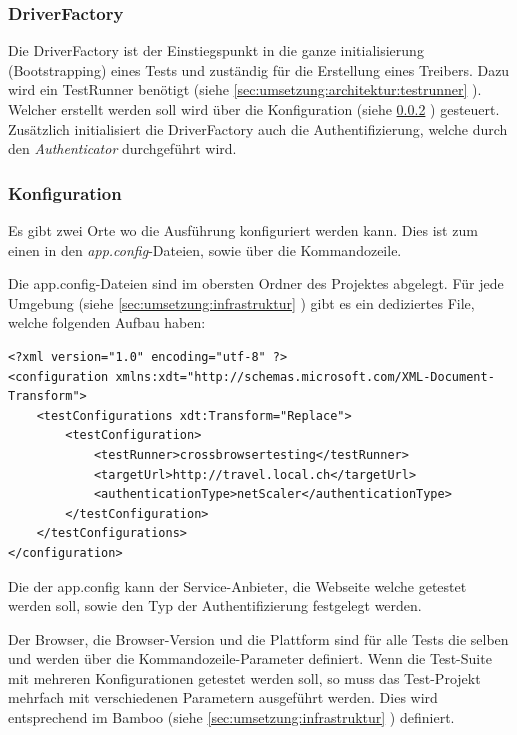 \subsubsection{DriverFactory}
\label{sec:umsetzung:Architektur:DriverFactory}
Die DriverFactory ist der Einstiegspunkt in die ganze initialisierung (Bootstrapping) eines Tests und zuständig für die Erstellung eines Treibers. Dazu wird ein TestRunner benötigt (siehe \cref{sec:umsetzung:architektur:testrunner} ). Welcher erstellt werden soll wird über die Konfiguration (siehe \cref{sec:umsetzung:architektur:bootstrap:konfiguration} ) gesteuert. Zusätzlich initialisiert die DriverFactory auch die Authentifizierung, welche durch den \textit{Authenticator} durchgeführt wird.

\subsubsection{Konfiguration}
\label{sec:umsetzung:architektur:bootstrap:konfiguration}
Es gibt zwei Orte wo die Ausführung konfiguriert werden kann. Dies ist zum einen in den \textit{app.config}-Dateien, sowie über die Kommandozeile.

Die app.config-Dateien sind im obersten Ordner des Projektes abgelegt. Für jede Umgebung (siehe \cref{sec:umsetzung:infrastruktur} ) gibt es ein dediziertes File, welche folgenden Aufbau haben:

\lstset{language=xml}
\begin{lstlisting}
<?xml version="1.0" encoding="utf-8" ?>
<configuration xmlns:xdt="http://schemas.microsoft.com/XML-Document-Transform">
	<testConfigurations xdt:Transform="Replace">
		<testConfiguration>
			<testRunner>crossbrowsertesting</testRunner>
			<targetUrl>http://travel.local.ch</targetUrl>
			<authenticationType>netScaler</authenticationType>
		</testConfiguration>
	</testConfigurations>
</configuration>
\end{lstlisting}

Die der app.config kann der Service-Anbieter, die Webseite welche getestet werden soll, sowie den Typ der Authentifizierung festgelegt werden.

Der Browser, die Browser-Version und die Plattform sind für alle Tests die selben und werden über die Kommandozeile-Parameter definiert. Wenn die Test-Suite mit mehreren Konfigurationen getestet werden soll, so muss das Test-Projekt mehrfach mit verschiedenen Parametern ausgeführt werden. Dies wird entsprechend im Bamboo (siehe \cref{sec:umsetzung:infrastruktur} ) definiert.


